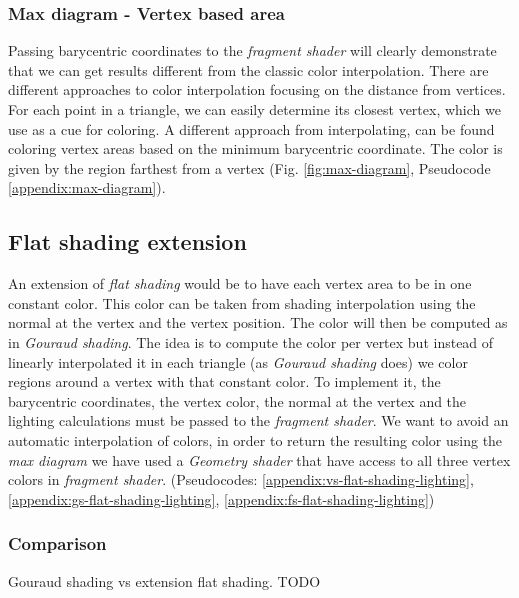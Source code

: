 
\subsubsection{Max diagram - Vertex based area} \label{section:max-diagram}
Passing barycentric coordinates to the \textit{fragment shader} will clearly demonstrate that we can get results different from the classic color interpolation.
\cite{WEBSITE:1}
There are different approaches to color interpolation focusing on the distance from vertices. For each point in a triangle, we can easily determine its closest vertex, which we use as a cue for coloring.
A different approach from interpolating, can be found coloring vertex areas based on the minimum barycentric coordinate.
The color is given by the region farthest from a vertex (Fig. \ref{fig:max-diagram}, Pseudocode \ref{appendix:max-diagram}).


\subsection{Flat shading extension} \label{section:extend-flat-shading-lighting}
An extension of \textit{flat shading} would be to have each vertex area to be in one constant color. This color can be taken from shading interpolation using the normal at the vertex and the vertex position.
The color will then be computed as in \textit{Gouraud shading}.
The idea is to compute the color per vertex but instead of linearly interpolated it in each triangle (as \textit{Gouraud shading} does) we color regions around a vertex with that constant color.
To implement it, the barycentric coordinates, the vertex color, the normal at the vertex and the lighting calculations must be passed to the \textit{fragment shader}.
We want to avoid an automatic interpolation of colors, in order to return the resulting color using the \textit{max diagram} we have used a \textit{Geometry shader} that have access to all three vertex colors in \textit{fragment shader}. (Pseudocodes: \ref{appendix:vs-flat-shading-lighting}, \ref{appendix:gs-flat-shading-lighting}, \ref{appendix:fs-flat-shading-lighting})

\subsubsection{Comparison}
Gouraud shading vs extension flat shading.
TODO

